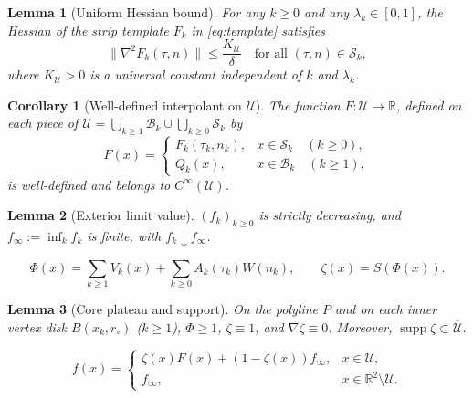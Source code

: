 \documentclass[10pt,a4paper]{amsart}
\newtheorem{lemma}{Lemma}
\newtheorem{corollary}{Corollary}
\newcommand{\R}{\mathbb{R}}
\begin{document}
\begin{lemma}[Uniform Hessian bound]
\label{lem:hessU}
For any $k\ge0$ and any $\lambda_k\in[0,1]$, the Hessian of the strip template $F_k$ in \eqref{eq:template} satisfies
\begin{equation}
\label{eq:hessU}
\|\nabla^2 F_k(\tau,n)\|\le\frac{K_{\mathcal U}}{\delta}
\quad\text{for all }(\tau,n)\in\mathcal S_k,
\end{equation}
where $K_{\mathcal U} > 0$ is a universal constant independent of $k$ and $\lambda_k$.
\end{lemma}

\begin{corollary}[Well-defined interpolant on $\mathcal U$]
\label{cor:F}
The function $F: \mathcal U \to \R$, defined on each piece of $\mathcal U = \bigcup_{k\ge 1}\mathcal B_k \cup \bigcup_{k\ge 0}\mathcal S_k$ by
\begin{equation}
\label{eq:Fdef}
F(x) = \begin{cases}
F_k(\tau_k, n_k), & x \in \mathcal S_k \quad (k \ge 0), \\
Q_k(x), & x \in \mathcal B_k \quad (k \ge 1),
\end{cases}
\end{equation}
is well-defined and belongs to $C^\infty(\mathcal U)$.
\end{corollary}

\begin{lemma}[Exterior limit value]
\label{lem:finf}
$(f_k)_{k\ge0}$ is strictly decreasing, and $f_\infty:=\inf_kf_k$ is
finite, with $f_k\downarrow f_\infty$.
\end{lemma}

\begin{equation}
\label{eq:Phidef}
\Phi(x) = \sum_{k\ge 1} V_k(x) + \sum_{k\ge 0} A_k(\tau_k) W(n_k), \qquad \zeta(x) = S(\Phi(x)).
\end{equation}

\begin{lemma}[Core plateau and support]
\label{lem:core}
On the polyline $P$ and on each inner vertex disk $B(x_k, r_\circ)$ ($k \ge 1$), $\Phi \ge 1$, $\zeta \equiv 1$, and $\nabla\zeta \equiv 0$.
Moreover, $\operatorname{supp}\zeta \subset \overline{\mathcal U}$.
\end{lemma}

\begin{equation}
\label{eq:fdef}
f(x) = \begin{cases}
\zeta(x) F(x) + (1-\zeta(x))f_\infty, & x \in \mathcal U, \\
f_\infty, & x \in \R^2\setminus \mathcal U.
\end{cases}
\end{equation}
\end{document}
